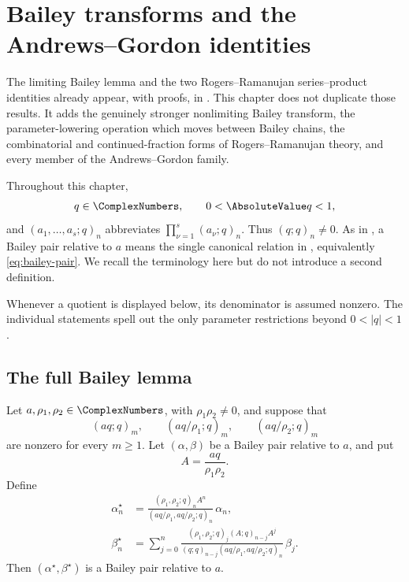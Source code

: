 \chapter{Bailey transforms and the Andrews--Gordon identities}\label{chap:bailey-andrews-gordon}


The limiting Bailey lemma and the two Rogers--Ramanujan series--product
identities already appear, with proofs, in
.  This chapter does not duplicate those results.  It adds
the genuinely stronger nonlimiting Bailey transform, the parameter-lowering
operation which moves between Bailey chains, the combinatorial and
continued-fraction forms of Rogers--Ramanujan theory, and every member of the
Andrews--Gordon family.

Throughout this chapter,
\[
  q\in\ComplexNumbers,\qquad 0<\AbsoluteValue q<1,
\]
and \((a_1,\ldots,a_s;q)_n\) abbreviates
\(\prod_{\nu=1}^{s}(a_\nu;q)_n\).  Thus \((q;q)_n\ne0\).
As in , a Bailey pair relative to \(a\) means the single
canonical relation in , equivalently
\eqref{eq:bailey-pair}.  We recall the terminology here but do not introduce a
second definition.

Whenever a quotient is displayed below, its denominator is assumed nonzero.
The individual statements spell out the only parameter restrictions beyond
\(0<|q|<1\).

\section{The full Bailey lemma}
\label{qg:sec:full-bailey-lemma}

\begin{theorem}
\label{qg:thm-bailey-lemma}
Let \(a,\rho_1,\rho_2\in\ComplexNumbers\), with
\(\rho_1\rho_2\ne0\), and suppose that
\[
  (aq;q)_m,\qquad
  (aq/\rho_1;q)_m,\qquad
  (aq/\rho_2;q)_m
\]
are nonzero for every \(m\ge1\).  Let \((\alpha,\beta)\) be a
Bailey pair relative to \(a\), and put
\[
  A=\frac{aq}{\rho_1\rho_2}.
\]
Define
\begin{align}
 \alpha_n^\star
 &=
 \frac{(\rho_1,\rho_2;q)_n A^n}
      {(aq/\rho_1,aq/\rho_2;q)_n}\,\alpha_n,
 \label{qg:eq:full-bailey-alpha}\\
 \beta_n^\star
 &=
 \sum_{j=0}^{n}
 \frac{(\rho_1,\rho_2;q)_j(A;q)_{n-j}A^j}
      {(q;q)_{n-j}(aq/\rho_1,aq/\rho_2;q)_n}\,\beta_j.
 \label{qg:eq:full-bailey-beta}
\end{align}
Then \((\alpha^\star,\beta^\star)\) is a Bailey pair relative to
\(a\).
\end{theorem}

